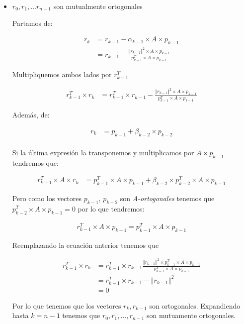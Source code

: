 \begin{itemize}
    \item $r_0, r_1, \ldots r_{n-1}$ son mutualmente ortogonales
    
    Partamos de:
    
    \begin{align*}
        r_k &= r_{k-1} - \alpha_{k-1} \times A \times p_{k-1}\\
            &= r_{k-1} - \frac{\left\Vert r_{k-1} \right\Vert^2 \times A \times p_{k-1} }{p^T_{k-1} \times A \times p_{k-1}}
    \end{align*}
    
    Multipliquemos ambos lados por $r^T_{k-1}$
    
    \begin{align*}
        r^T_{k-1} \times r_k &= r^T_{k-1} \times r_{k-1} - \frac{\left\Vert r_{k-1} \right\Vert^2 \times A \times p_{k-1} }{p^T_{k-1} \times A \times p_{k-1}}
    \end{align*}
    
    Además, de:
    
    \begin{align*}
        r_k &= p_{k-1} + \beta_{k-2} \times p_{k-2}\\
    \end{align*}
    
    Si la última expresión la transponemos y multiplicamos por $A \times p_{k-1}$ tendremos que:
    
    \begin{align*}
        r^T_{k-1} \times A \times r_k &= p^T_{k-1} \times A \times p_{k-1} + \beta_{k-2} \times p^T_{k-2} \times A \times p_{k-1}
    \end{align*}
    
    Pero como los vectores $p_{k-1}$, $p_{k-2}$ son \textit{A-ortogonales} tenemos que $p^T_{k-2} \times A \times p_{k-1} = 0$ por lo que tendremos:
    
    \begin{align*}
        r^T_{k-1} \times A \times p_{k-1} = p^T_{k-1} \times A \times p_{k-1}
    \end{align*}
    
    Reemplazando la ecuación anterior tenemos que
    
    \begin{align*}
        r^T_{k-1} \times r_k &= r^T_{k-1} \times r_{k-1} \frac{\left\Vert r_{k-1} \right\Vert^2 \times p^T_{k-1} \times A \times p_{k-1} } {p^T_{k-1} \times A \times p_{k-1}}\\
        &= r^T_{k-1} \times r_{k-1} - \left\Vert r_{k-1} \right\Vert^2\\
        &= 0
    \end{align*}
    
Por lo que tenemos que los vectores $r_k, r_{k-1}$ son ortogonales. Expandiendo hasta $k=n-1$ tenemos que $r_0, r_1, \ldots, r_{n-1}$ son mutuamente ortogonales.
\end{itemize}